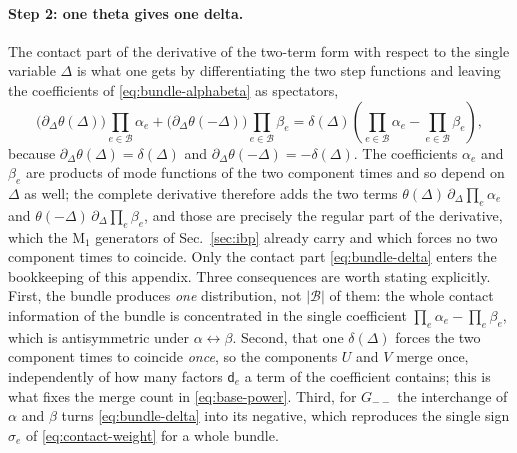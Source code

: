 \documentclass[11pt,a4paper]{article}
\newcommand{\cB}{\mathcal B}
\begin{document}
\paragraph{Step 2: one theta gives one delta.}
The contact part of the derivative of the two-term form with respect to the single variable $\Delta$ is
what one gets by differentiating the two step functions and leaving the coefficients of
\eqref{eq:bundle-alphabeta} as spectators,
\begin{equation}
  \big(\partial_\Delta\theta(\Delta)\big)\prod_{e\in\cB}\alpha_e
  +\big(\partial_\Delta\theta(-\Delta)\big)\prod_{e\in\cB}\beta_e
  =\delta(\Delta)\left(\prod_{e\in\cB}\alpha_e-\prod_{e\in\cB}\beta_e\right),
  \label{eq:bundle-delta}
\end{equation}
because $\partial_\Delta\theta(\Delta)=\delta(\Delta)$ and
$\partial_\Delta\theta(-\Delta)=-\delta(\Delta)$. The coefficients $\alpha_e$ and $\beta_e$ are
products of mode functions of the two
component times and so depend on $\Delta$ as well; the complete derivative therefore adds the two terms
$\theta(\Delta)\,\partial_\Delta\prod_e\alpha_e$ and $\theta(-\Delta)\,\partial_\Delta\prod_e\beta_e$,
and those are precisely the regular part of the derivative, which the $\text{M}_1$ generators of
Sec.~\ref{sec:ibp} already carry and which forces no two component times to coincide. Only the contact
part \eqref{eq:bundle-delta} enters the bookkeeping of this appendix.
Three consequences are worth stating explicitly.
First, the bundle produces \emph{one} distribution, not $|\cB|$ of them: the whole contact information
of the bundle is concentrated in the single coefficient
$\prod_e\alpha_e-\prod_e\beta_e$, which is antisymmetric under
$\alpha\leftrightarrow\beta$. Second, that one $\delta(\Delta)$ forces the two component times to
coincide \emph{once}, so the components $U$ and $V$ merge once, independently of how many factors
$\mathsf d_e$ a term of the coefficient contains; this is what fixes the merge count in
\eqref{eq:base-power}. Third, for $G_{--}$ the interchange of $\alpha$ and $\beta$ turns
\eqref{eq:bundle-delta} into its negative, which reproduces the single sign $\sigma_e$ of
\eqref{eq:contact-weight} for a whole bundle.
\end{document}
